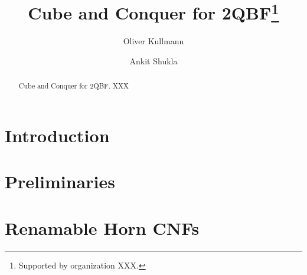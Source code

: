 \documentclass[runningheads]{llncs}
\begin{document}
%
\title{Cube and Conquer for 2QBF\thanks{Supported by organization  XXX.}}
%
%
\author{Oliver Kullmann \and Ankit Shukla}



\maketitle              %
%
\begin{abstract}
Cube and Conquer for 2QBF.
XXX 
\end{abstract}
%
%
%
\section{Introduction} \label{sec:introduction}

\section{Preliminaries} \label{sec:preliminaries}

\section{Renamable Horn CNFs} \label{sec:renamable-horn}
%
%

 
 
\end{document}

